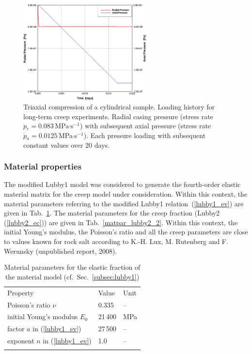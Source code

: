 \clearpage

\begin{figure}[!htb]
\begin{center}
\includegraphics[width=0.6\textwidth]{M/figure/creep/svvcreep_e_HL_loadhistory.eps}
\end{center}
\caption{Triaxial compression of a cylindrical sample. Loading history for long-term creep experiments. Radial casing pressure (stress rate $\dot{p}{}_r=0.083$\,MPa$\cdot$s$^{-1}$) with subsequent axial pressure (stress rate $\dot{p}{}_a=0.0125$\,MPa$\cdot$s$^{-1}$). Each pressure loading with subsequent constant values over 20 days.} 
\label{triax_loadhist_lubby2}
\end{figure}

\subsubsection*{Material properties}

The modified Lubby1 model was considered to generate the fourth-order elastic material matrix for the creep model under consideration. Within this context, the material parameters referring to the modified Lubby1 relation~(\ref{lubby1_ev}) are given in Tab.~\ref{matpar_lubby2_1}. The material parameters for the creep fraction (Lubby2 (\ref{lubby2_ec})) are given in Tab.~\ref{matpar_lubby2_2}. Within this context, the initial Young's modulus, the Poisson's ratio and all the creep parameters are close to values known for rock salt according to K.-H. Lux, M. Rutenberg and F. Werunsky (unpublished report, 2008). 
 
\begin{table}[!htb]
\centering
\begin{tabular}{lll}
\hline\hline\noalign{\smallskip}
Property & Value & Unit \\
\noalign{\smallskip}\hline\noalign{\smallskip}
Poisson's ratio $\nu$             & 0.335   & --  \\
initial Young's modulus $E_0$     & 21\,400 & MPa \\
factor $a$ in (\ref{lubby1_ev})   & 27\,500 & --  \\
exponent $n$ in (\ref{lubby1_ev}) & 1.0     & --  \\
\noalign{\smallskip}\hline\hline
\end{tabular}
\caption{Material parameters for the elastic fraction of the material model (cf.~Sec.~\ref{subsec:lubby1})}
\label{matpar_lubby2_1}
\end{table}
 
